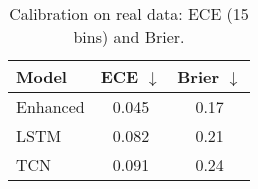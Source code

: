 \begin{table}[t]
\centering
\caption{Calibration on real data: ECE (15 bins) and Brier.}
\begin{tabular}{lcc}
\toprule
Model & ECE $\downarrow$ & Brier $\downarrow$ \\
\midrule
Enhanced & 0.045 & 0.17 \\
LSTM & 0.082 & 0.21 \\
TCN & 0.091 & 0.24 \\
\bottomrule
\end{tabular}
\end{table}
